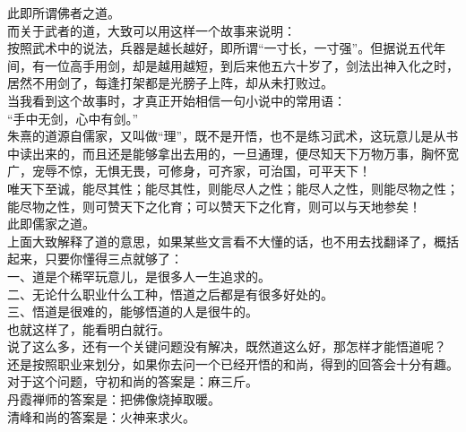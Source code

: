 \begin{multicols}{\theparacolNo}
此即所谓佛者之道。\\

而关于武者的道，大致可以用这样一个故事来说明：\\

按照武术中的说法，兵器是越长越好，即所谓“一寸长，一寸强”。但据说五代年间，有一位高手用剑，却是越用越短，到后来他五六十岁了，剑法出神入化之时，居然不用剑了，每逢打架都是光膀子上阵，却从未打败过。\\

当我看到这个故事时，才真正开始相信一句小说中的常用语：\\

“手中无剑，心中有剑。”\\

朱熹的道源自儒家，又叫做“理”，既不是开悟，也不是练习武术，这玩意儿是从书中读出来的，而且还是能够拿出去用的，一旦通理，便尽知天下万物万事，胸怀宽广，宠辱不惊，无惧无畏，可修身，可齐家，可治国，可平天下！\\

唯天下至诚，能尽其性；能尽其性，则能尽人之性；能尽人之性，则能尽物之性；能尽物之性，则可赞天下之化育；可以赞天下之化育，则可以与天地参矣！\\

此即儒家之道。\\

上面大致解释了道的意思，如果某些文言看不大懂的话，也不用去找翻译了，概括起来，只要你懂得三点就够了：\\

一、道是个稀罕玩意儿，是很多人一生追求的。\\

二、无论什么职业什么工种，悟道之后都是有很多好处的。\\

三、悟道是很难的，能够悟道的人是很牛的。\\

也就这样了，能看明白就行。\\

说了这么多，还有一个关键问题没有解决，既然道这么好，那怎样才能悟道呢？\\

还是按照职业来划分，如果你去问一个已经开悟的和尚，得到的回答会十分有趣。\\

对于这个问题，守初和尚的答案是：麻三斤。\\

丹霞禅师的答案是：把佛像烧掉取暖。\\

清峰和尚的答案是：火神来求火。\\


\end{multicols}
